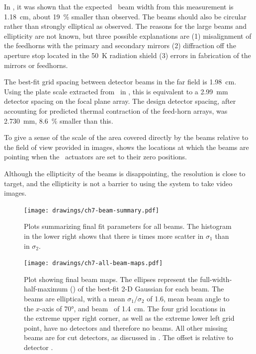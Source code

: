In , it was shown that the expected \FWHM\ beam width from this measurement is \SI{1.18}{\cm}, about \SI{19}{\percent} smaller than observed.
The beams should also be circular rather than strongly elliptical as observed.
The reasons for the large beams and ellipticity are not known, but three possible explanations are (1) misalignment of the feedhorns with the primary and secondary mirrors (2) diffraction off the aperture stop located in the \SI{50}{\kelvin} radiation shield (3) errors in fabrication of the mirrors or feedhorns.

The best-fit grid spacing between detector beams in the far field is \SI{1.98}{\cm}.
Using the plate scale extracted from \ZEMAX\ in , this is equivalent to a \SI{2.99}{\mm} detector spacing on the focal plane array.
The design detector spacing, after accounting for predicted thermal contraction of the feed-horn arrays, was \SI{2.730}{\mm}, \SI{8.6}{\percent} smaller than this.

To give a sense of the scale of the area covered directly by the beams relative to the field of view provided in images,  shows the locations at which the beams are pointing when the \BOSE\ actuators are set to their zero positions.

Although the ellipticity of the beams is disappointing, the resolution is close to target, and the ellipticity is not a barrier to using the system to take video images.

\begin{figure}
\centering
\texttt{[image: drawings/ch7-beam-summary.pdf]}
\caption[Beam fit parameters]{
  Plots summarizing final fit parameters for all beams.
  The histogram in the lower right shows that there is  times more scatter in $\sigma_1$ than in $\sigma_2$. 
}
\label{fig:ch7-beam-summary}
\end{figure}

\begin{figure}
\centering
\texttt{[image: drawings/ch7-all-beam-maps.pdf]}
\caption[Beam maps]{
Plot showing final beam maps.
The ellipses represent the full-width-half-maximum (\FWHM) of the best-fit 2-D Gaussian for each beam. The beams are elliptical, with a mean $\sigma_1/\sigma_2$ of 1.6, mean beam angle to the $x$-axis of \ang{70}, and beam \FWHM\ of \SI{1.4}{\cm}.
The four grid locations in the extreme upper right corner, as well as the extreme lower left grid point, have no detectors and therefore no beams. All other missing beams are for cut detectors, as discussed in .
The offset is relative to detector .
}
\label{fig:ch7-all-beam-maps}
\end{figure}

